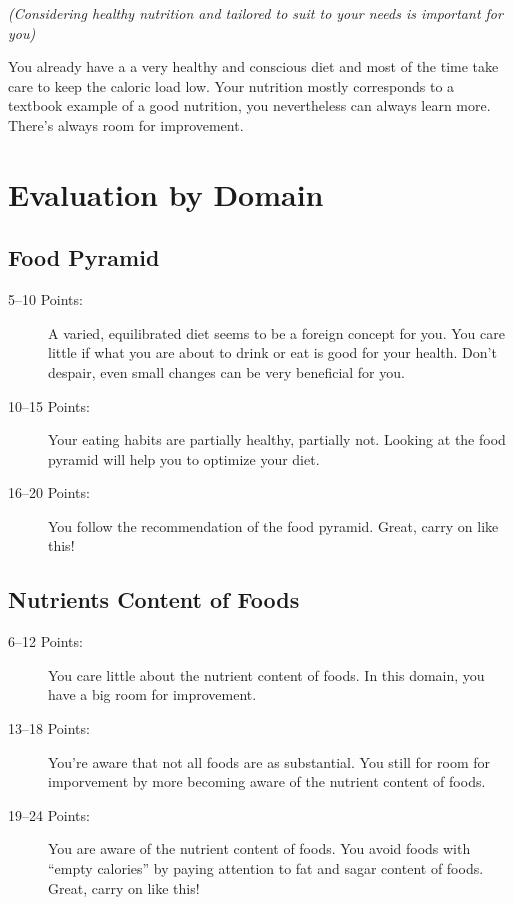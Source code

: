 \documentclass[../main.tex]{subfiles}
\begin{document}
\noindent  \emph{(Considering healthy nutrition and tailored to suit to your needs is important for you)}

\vspace{2mm}

You already have a a very healthy and conscious diet and most of the time take care to keep the caloric load low.
Your nutrition mostly corresponds to a textbook example of a good nutrition, you nevertheless can always learn more.
There's always room for improvement.

\section{Evaluation by Domain}

\subsection{Food Pyramid}

\begin{description}
\item[5--10 Points:] A varied, equilibrated diet seems to be a foreign concept for you.
  You care little if what you are about to drink or eat is good for your health.
  Don't despair, even small changes can be very beneficial for you.
\item[10--15 Points:] Your eating habits are partially healthy, partially not.
  Looking at the food pyramid will help you to optimize your diet.
\item[16--20 Points:] You follow the recommendation of the food pyramid.
  Great, carry on like this!
\end{description}


\subsection{Nutrients Content of Foods}

\begin{description}
\item[6--12 Points:]  You care little about the nutrient content of foods. 
  In this domain, you have a big room for improvement.
\item[13--18 Points:] You're aware that not all foods are as substantial.
  You still for room for imporvement by more becoming aware of the nutrient content of foods.
\item[19--24 Points:] You are aware of the nutrient content of foods.
  You avoid foods with ``empty calories'' by paying attention to fat and sagar content of foods.
  Great, carry on like this!
\end{description}
\end{document}

